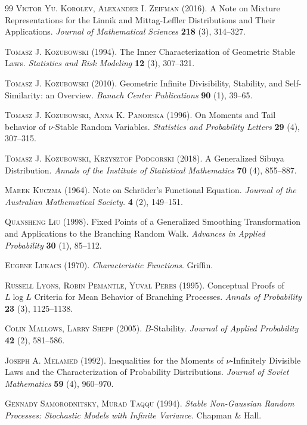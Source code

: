 \documentclass[12pt]{amsart}
\theoremstyle{remark}
\theoremstyle{definition}
\begin{document}
\begin{thebibliography}{99}
 \textsc{Victor Yu. Korolev, Alexander I. Zeifman} (2016). A Note on Mixture Representations for the Linnik and Mittag-Leffler Distributions and Their Applications. \textit{Journal of Mathematical Sciences} \textbf{218} (3), 314--327. 

 \textsc{Tomasz J. Kozubowski} (1994). The Inner Characterization of Geometric Stable Laws. \textit{Statistics and Risk Modeling} \textbf{12} (3), 307--321. 

 \textsc{Tomasz J. Kozubowski} (2010). Geometric Infinite Divisibility, Stability, and Self-Similarity: an Overview. \textit{Banach Center Publications} \textbf{90} (1), 39--65. 

 \textsc{Tomasz J. Kozubowski, Anna K. Panorska} (1996). On Moments and Tail behavior of $\nu$-Stable Random Variables. \textit{Statistics and Probability Letters} \textbf{29} (4), 307--315. 

 \textsc{Tomasz J. Kozubowski, Krzysztof Podgorski} (2018). A Generalized Sibuya Distribution. {\it Annals of the Institute of Statistical Mathematics} \textbf{70} (4), 855--887.

 \textsc{Marek Kuczma} (1964). Note on Schr\"oder's Functional Equation. {\it Journal of the Australian Mathematical Society.} \textbf{4} (2), 149--151.

 \textsc{Quansheng Liu} (1998). Fixed Points of a Generalized Smoothing Transformation and Applications to the Branching Random Walk. \textit{Advances in Applied Probability} \textbf{30} (1), 85--112. 

 \textsc{Eugene Lukacs} (1970). \textit{Characteristic Functions}. Griffin.

 \textsc{Russell Lyons, Robin Pemantle, Yuval Peres} (1995). Conceptual Proofs of $L\log L$ Criteria for Mean Behavior of Branching Processes. \textit{Annals of Probability} \textbf{23} (3), 1125--1138.

 \textsc{Colin Mallows, Larry Shepp} (2005). $B$-Stability. \textit{Journal of Applied Probability} \textbf{42} (2), 581--586. 

 \textsc{Joseph A. Melamed} (1992). Inequalities for the Moments of $\nu$-Infinitely Divisible Laws and the Characterization of Probability Distributions. \textit{Journal of Soviet Mathematics} \textbf{59} (4), 960--970.  

 \textsc{Gennady Samorodnitsky, Murad Taqqu} (1994). \textit{Stable Non-Gaussian Random Processes: Stochastic Models with Infinite Variance.} Chapman \& Hall. 


\end{thebibliography}
\end{document}
